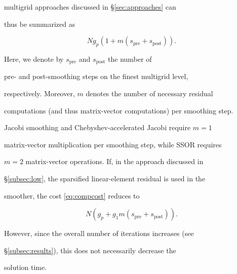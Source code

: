 \documentclass[smallcondensed,final]{svjour3}     %
\begin{document}
multigrid approaches discussed in \S\ref{sec:approaches} can

thus be summarized as

\begin{equation}\label{eq:compcost}

  Ng_p(1+m(s_\text{pre}+s_\text{post})).

\end{equation}

Here, we denote by $s_\text{pre}$ and $s_\text{post}$ the number of

pre- and post-smoothing steps on the finest multigrid level,

respectively. Moreover, $m$ denotes the number of necessary residual

computations (and thus matrix-vector computations) per smoothing step.

Jacobi smoothing and Chebyshev-accelerated Jacobi require $m=1$

matrix-vector multiplication per smoothing step, while SSOR requires

$m=2$ matrix-vector operations. If, in the approach discussed in

\S\ref{subsec:low}, the sparsified linear-element residual is used in the

smoother, the cost \eqref{eq:compcost} reduces to

\begin{equation}\label{eq:compcost2}

  N(g_p + g_1 m(s_\text{pre}+s_\text{post})).

\end{equation}

However, since the overall number of iterations increases (see

\S\ref{subsec:results}), this does not necessarily decrease the

solution time.











\end{document}
